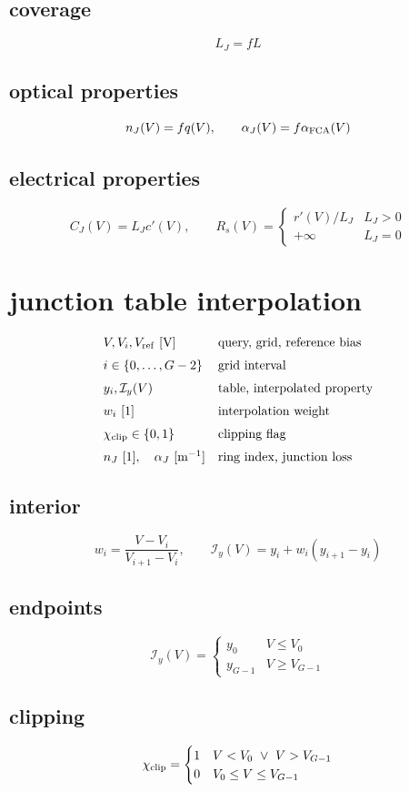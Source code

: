 \documentclass[11pt]{article}
\begin{document}
\subsection*{coverage}
\[
\displaystyle L_J=fL
\]
\subsection*{optical properties}
\[
\displaystyle n_J(V)=fq(V),\qquad\alpha_J(V)=f\alpha_{\rm FCA}(V)
\]
\subsection*{electrical properties}
\[
\displaystyle C_J(V)=L_Jc'(V),\qquad R_s(V)=\begin{cases}r'(V)/L_J&L_J>0\\+\infty&L_J=0\end{cases}
\]

\clearpage
\section*{junction table interpolation}
\[
\begin{array}{ll}V,V_i,V_{\rm ref}\ [\mathrm V]&\text{query, grid, reference bias}\\[0.6em]i\in\{0,\ldots,G-2\}&\text{grid interval}\\[0.6em]y_i,\mathcal I_y(V)&\text{table, interpolated property}\\[0.6em]w_i\ [1]&\text{interpolation weight}\\[0.6em]\chi_{\rm clip}\in\{0,1\}&\text{clipping flag}\\[0.6em]n_J\ [1],\quad\alpha_J\ [\mathrm{m^{-1}}]&\text{ring index, junction loss}\end{array}
\]
\subsection*{interior}
\[
\displaystyle w_i=\frac{V-V_i}{V_{i+1}-V_i},\qquad\mathcal I_y(V)=y_i+w_i(y_{i+1}-y_i)
\]
\subsection*{endpoints}
\[
\displaystyle \mathcal I_y(V)=\begin{cases}y_0&V\le V_0\\y_{G-1}&V\ge V_{G-1}\end{cases}
\]
\subsection*{clipping}
\[
\displaystyle \chi_{\rm clip}=\begin{cases}1&V<V_0\ \lor\ V>V_{G-1}\\0&V_0\le V\le V_{G-1}\end{cases}
\]
\end{document}
